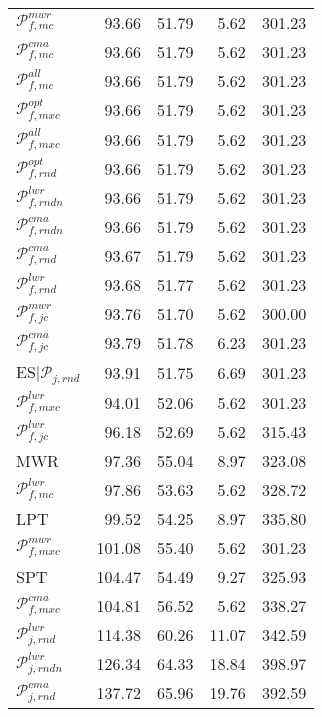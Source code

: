 \begin{tabular}{|@{}l@{}|@{}r@{}|@{}r@{}|@{}r@{}|@{}r@{}|}
${\mathcal{P}_{f,mc}^{mwr}}$ &  93.66 &  51.79 &  5.62 &  301.23  \\ 
${\mathcal{P}_{f,mc}^{cma}}$ &  93.66 &  51.79 &  5.62 &  301.23  \\ 
${\mathcal{P}_{f,mc}^{all}}$ &  93.66 &  51.79 &  5.62 &  301.23  \\ 
\boldmath${\mathcal{P}_{f,mxc}^{opt}}$ &  93.66 &  51.79 &  5.62 &  301.23  \\ 
\boldmath${\mathcal{P}_{f,mxc}^{all}}$ &  93.66 &  51.79 &  5.62 &  301.23  \\ 
${\mathcal{P}_{f,rnd}^{opt}}$ &  93.66 &  51.79 &  5.62 &  301.23  \\ 
${\mathcal{P}_{f,rndn}^{lwr}}$ &  93.66 &  51.79 &  5.62 &  301.23  \\ 
${\mathcal{P}_{f,rndn}^{cma}}$ &  93.66 &  51.79 &  5.62 &  301.23  \\ 
${\mathcal{P}_{f,rnd}^{cma}}$ &  93.67 &  51.79 &  5.62 &  301.23  \\ 
${\mathcal{P}_{f,rnd}^{lwr}}$ &  93.68 &  51.77 &  5.62 &  301.23  \\ 
${\mathcal{P}_{f,jc}^{mwr}}$ &  93.76 &  51.70 &  5.62 &  300.00  \\ 
${\mathcal{P}_{f,jc}^{cma}}$ &  93.79 &  51.78 &  6.23 &  301.23  \\ 
ES$|{\mathcal{P}_{j,rnd}}$ &  93.91 &  51.75 &  6.69 &  301.23  \\ 
\boldmath${\mathcal{P}_{f,mxc}^{lwr}}$ &  94.01 &  52.06 &  5.62 &  301.23  \\ 
${\mathcal{P}_{f,jc}^{lwr}}$ &  96.18 &  52.69 &  5.62 &  315.43  \\ 
MWR &  97.36 &  55.04 &  8.97 &  323.08  \\ 
${\mathcal{P}_{f,mc}^{lwr}}$ &  97.86 &  53.63 &  5.62 &  328.72  \\ 
LPT &  99.52 &  54.25 &  8.97 &  335.80  \\ 
\boldmath${\mathcal{P}_{f,mxc}^{mwr}}$ &  101.08 &  55.40 &  5.62 &  301.23  \\ 
SPT &  104.47 &  54.49 &  9.27 &  325.93  \\ 
\boldmath${\mathcal{P}_{f,mxc}^{cma}}$ &  104.81 &  56.52 &  5.62 &  338.27  \\ 
${\mathcal{P}_{j,rnd}^{lwr}}$ &  114.38 &  60.26 &  11.07 &  342.59  \\ \hline\hline
${\mathcal{P}_{j,rndn}^{lwr}}$ &  126.34 &  64.33 &  18.84 &  398.97  \\ \hline\hline
${\mathcal{P}_{j,rnd}^{cma}}$ &  137.72 &  65.96 &  19.76 &  392.59  \\ \hline
\end{tabular}
